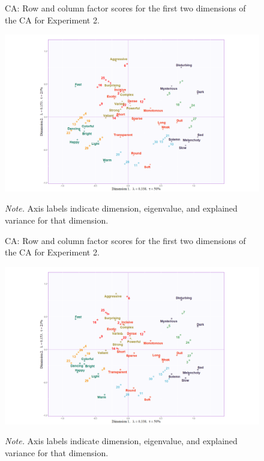 \documentclass[
]{article}
\begin{document}
\begin{figure}[H]   
  \centering  
  \caption{CA: Row and column factor scores for the first two dimensions of the CA for Experiment 2.}
    \includegraphics{./supmatsimgs/asym.png}
  \label{fig:asym}
  \caption*{\footnotesize \textit{Note.} Axis labels indicate dimension, eigenvalue, and explained variance for that dimension.}
\end{figure}

\begin{figure}[H]   
  \centering  
  \caption{CA: Row and column factor scores for the first two dimensions of the CA for Experiment 2.}
    \includegraphics{./supmatsimgs/asymrepel.png}
  \label{fig:asymrepel}
  \caption*{\footnotesize \textit{Note.} Axis labels indicate dimension, eigenvalue, and explained variance for that dimension.}
\end{figure}
\end{document}

